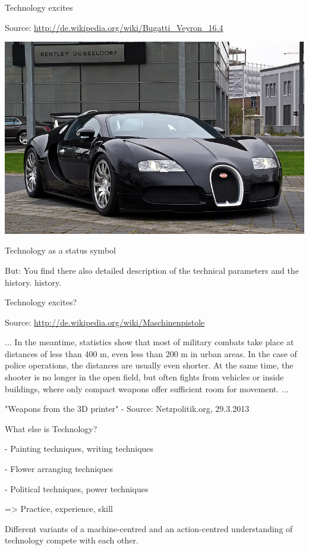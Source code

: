\documentclass{beamer}
\begin{document}
\begin{frame}{Technology excites}

Source: \url{http://de.wikipedia.org/wiki/Bugatti_Veyron_16.4}
\begin{center}
  \includegraphics[width=.7\textwidth]{Bugatti.jpg}
\end{center}

Technology as a status symbol

But: You find there also detailed description of the technical parameters and
the history.  history.

\end{frame}

\begin{frame}{Technology excites?}

Source: \url{http://de.wikipedia.org/wiki/Maschinenpistole}

... In the meantime, statistics show that most of military combats take place
at distances of less than 400 m, even less than 200 m in urban areas. In the
case of police operations, the distances are usually even shorter.  At the
same time, the shooter is no longer in the open field, but often fights from
vehicles or inside buildings, where only compact weapons offer sufficient room
for movement. ...

"Weapons from the 3D printer" - Source: Netzpolitik.org, 29.3.2013

\end{frame}

\begin{frame}{What else is Technology?}

- Painting techniques, writing techniques

- Flower arranging techniques

- Political techniques, power techniques

=> Practice, experience, skill

Different variants of a machine-centred and an action-centred understanding of
technology compete with each other.

\end{frame}
\end{document}
